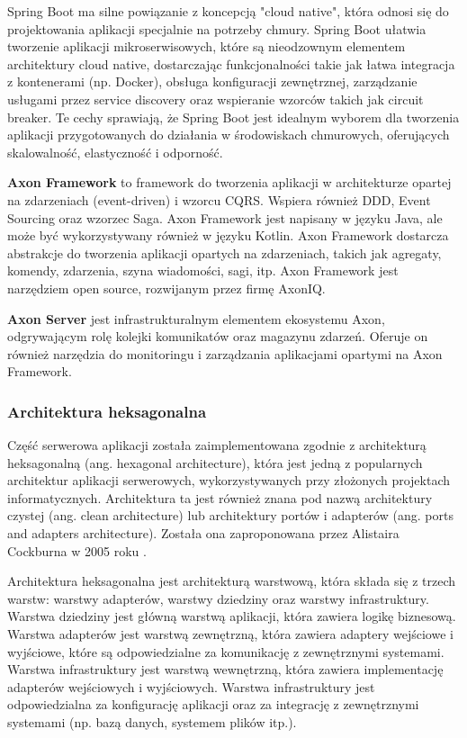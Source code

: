 Spring Boot ma silne powiązanie z koncepcją "cloud native", która odnosi się do projektowania aplikacji specjalnie na potrzeby chmury. Spring Boot ułatwia tworzenie aplikacji mikroserwisowych, które są nieodzownym elementem architektury cloud native, dostarczając funkcjonalności takie jak łatwa integracja z kontenerami (np. Docker), obsługa konfiguracji zewnętrznej, zarządzanie usługami przez service discovery oraz wspieranie wzorców takich jak circuit breaker. Te cechy sprawiają, że Spring Boot jest idealnym wyborem dla tworzenia aplikacji przygotowanych do działania w środowiskach chmurowych, oferujących skalowalność, elastyczność i odporność.

\textbf{Axon Framework} to framework do tworzenia aplikacji w architekturze opartej na zdarzeniach (event-driven) i wzorcu CQRS. Wspiera również DDD, Event Sourcing oraz wzorzec Saga. Axon Framework jest napisany w języku Java, ale może być wykorzystywany również w języku Kotlin. Axon Framework dostarcza abstrakcje do tworzenia aplikacji opartych na zdarzeniach, takich jak agregaty, komendy, zdarzenia, szyna wiadomości, sagi, itp. Axon Framework jest narzędziem open source, rozwijanym przez firmę AxonIQ.

\textbf{Axon Server} jest infrastrukturalnym elementem ekosystemu Axon, odgrywającym rolę kolejki komunikatów oraz magazynu zdarzeń. Oferuje on również narzędzia do monitoringu i zarządzania aplikacjami opartymi na Axon Framework.

\subsubsection{Architektura heksagonalna}

Część serwerowa aplikacji została zaimplementowana zgodnie z architekturą heksagonalną (ang. hexagonal architecture), która jest jedną z popularnych architektur aplikacji serwerowych, wykorzystywanych przy złożonych projektach informatycznych. Architektura ta jest również znana pod nazwą architektury czystej (ang. clean architecture) lub architektury portów i adapterów (ang. ports and adapters architecture). Została ona zaproponowana przez Alistaira Cockburna w 2005 roku \cite{cockburn2005hexagonal}.

Architektura heksagonalna jest architekturą warstwową, która składa się z trzech warstw: warstwy adapterów, warstwy dziedziny oraz warstwy infrastruktury. Warstwa dziedziny jest główną warstwą aplikacji, która zawiera logikę biznesową. Warstwa adapterów jest warstwą zewnętrzną, która zawiera adaptery wejściowe i wyjściowe, które są odpowiedzialne za komunikację z zewnętrznymi systemami. Warstwa infrastruktury jest warstwą wewnętrzną, która zawiera implementację adapterów wejściowych i wyjściowych. Warstwa infrastruktury jest odpowiedzialna za konfigurację aplikacji oraz za integrację z zewnętrznymi systemami (np. bazą danych, systemem plików itp.).

